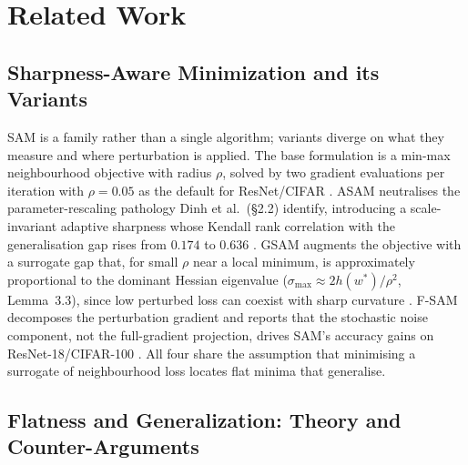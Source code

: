 \section{Related Work}

\subsection{Sharpness-Aware Minimization and its Variants}

SAM is a family rather than a single algorithm; variants diverge on what they measure and where perturbation is applied. The base formulation is a min-max neighbourhood objective with radius $\rho$, solved by two gradient evaluations per iteration with $\rho=0.05$ as the default for ResNet/CIFAR \cite{foret2020_sharpness_aware}.
ASAM neutralises the parameter-rescaling pathology Dinh et al.\ (\S2.2) identify, introducing a scale-invariant adaptive sharpness whose Kendall rank correlation with the generalisation gap rises from $0.174$ to $0.636$ \cite{kwon2021_asam_adaptive}.
GSAM augments the objective with a surrogate gap that, for small $\rho$ near a local minimum, is approximately proportional to the dominant Hessian eigenvalue ($\sigma_{\max}\!\approx\!2h(w^*)/\rho^2$, Lemma~3.3), since low perturbed loss can coexist with sharp curvature \cite{zhuang2022_surrogate_gap}.
F-SAM decomposes the perturbation gradient and reports that the stochastic noise component, not the full-gradient projection, drives SAM's accuracy gains on ResNet-18/CIFAR-100 \cite{li2024_friendly_sharpness}.
All four share the assumption that minimising a surrogate of neighbourhood loss locates flat minima that generalise.

\subsection{Flatness and Generalization: Theory and Counter-Arguments}

